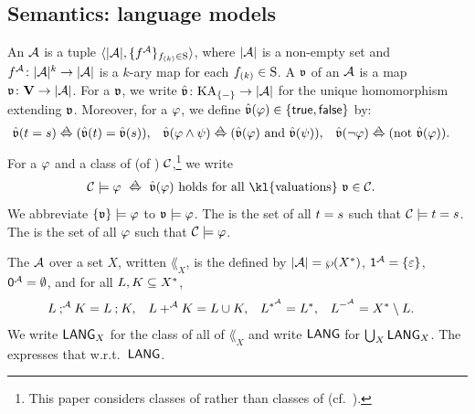 \subsection{Semantics: language models}\label{section: semantics}
An \intro*{} $\alg$ is a tuple $\tuple{\domain{\alg}, \set{f^{\alg}}_{f_{(k)} \in \sig}}$, where $\domain{\alg}$ is a non-empty set and $f^{\alg} \colon \domain{\alg}^{k} \to \domain{\alg}$ is a $k$-ary map for each $f_{(k)} \in \mathrm{S}$.
A \intro*{} $\mathfrak{v}$ of an  $\alg$ is a map $\val \colon \vsig \to \domain{\alg}$.
For a  $\mathfrak{v}$, we write $\hat{\val} \colon \KAtermclass_{\set{-}} \to \domain{\alg}$ for the unique homomorphism extending $\mathfrak{v}$.
Moreover, for a  $\fml$, we define $\hat{\val}(\fml) \in \set{\const{true}, \const{false}}$ by:
\begin{align*}
    \hat{\val}(\term[1] = \term[2])  &\defiff (\hat{\val}(\term[1]) = \hat{\val}(\term[2])),&
    \hat{\val}(\fml[1] \land \fml[2])  &\defiff (\hat{\val}(\fml[1])  \mbox{ and } \hat{\val}(\fml[2])), &
    \hat{\val}(\lnot \fml[1])  &\defiff (\mbox{not } \hat{\val}(\fml[1])).
\end{align*}
For a  $\fml$ and a class of  (of ) $\algclass$,\footnote{This paper considers classes of  rather than classes of  (cf.\ ).}
we write
\begin{align*}
\algclass \models \fml & \  \defiff \  \hat{\val}(\fml) \mbox{ holds for all \kl{valuations} $\val \in \algclass$}.
\end{align*}
We abbreviate $\set{\val} \models \fml$ to $\val \models \fml$.
The \intro*{} is the set of all  $\term[1] = \term[2]$ such that $\algclass \models \term[1] = \term[2]$.
The \intro*{} is the set of all  $\fml$ such that $\algclass \models \fml$.

The \intro*{} $\alg$ over a set $X$, written $\lang_{X}$, is the  defined by $\domain{\alg} = \wp(X^{\kstar})$,
$\id^{\alg} = \set{\eps}$,
$\emp^{\alg} = \emptyset$, and
for all $\la[1], \la[2] \subseteq X^{\kstar}$,
\begin{align*}
    \la[1] \compo^{\alg} \la[2] & = \la[1] \compo \la[2],         &
    \la[1] \union^{\alg} \la[2] & = \la[1] \cup \la[2],         &
    \la[1]^{\kstar^{\alg}}      & = \la[1]^{\kstar},              &
    \la[1]^{\compl^{\alg}}      & = X^{\kstar} \setminus \la[1].
\end{align*}
We write $\mathsf{LANG}_{X}$ for the class of all  of $\lang_{X}$ and write $\mathsf{LANG}$ for $\bigcup_{X} \mathsf{LANG}_{X}$.
The \intro*{} expresses that w.r.t.\ $\mathsf{LANG}$.

